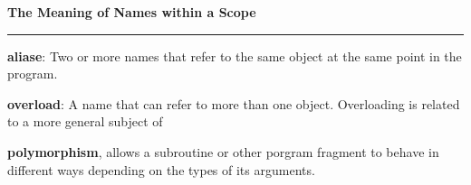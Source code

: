 \nopagenumbers
{\bf The Meaning of Names within a Scope}
\vskip 1mm
\hrule

\vskip 6pt
{\bf aliase}: Two or more names that refer to the same object at the same point in the program.

\vskip 6pt
{\bf overload}: A name that can refer to more than one object. Overloading is related to a more general subject of 

\vskip 6pt
{\bf polymorphism}, allows a subroutine or other porgram fragment to behave in different ways depending on the types of its arguments.

\vfill\eject
\bye
